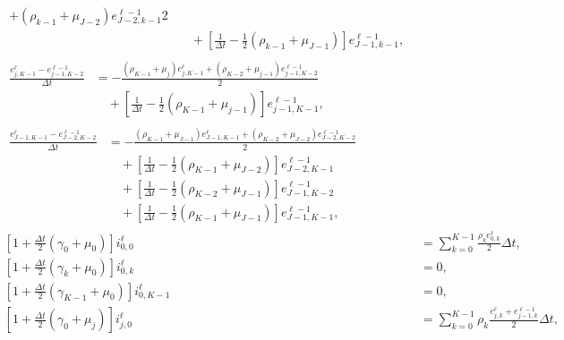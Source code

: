 \documentclass{jpmarticle}
\let\subequationsorig\subequations%
\let\endsubequationsorig\endsubequations%
\renewenvironment{subequations}{
  \subequationsorig
  \renewcommand{\theequation}{\theparentequation.\arabic{equation}}
}{
  \endsubequationsorig
}
\begin{document}
\begin{subequations}
\begin{align}
\begin{split}
{        + (\rho_{k - 1} + \mu_{J - 2}) e_{J - 2, k - 1}^{\ell - 1}}
      {2}
      \\ & \quad {}
      + \left[
        \frac{1}{\Delta t} - \frac{1}{2} (\rho_{k - 1} + \mu_{J - 1})
      \right] e_{J - 1, k - 1}^{\ell - 1},
    \end{split}
    \\
    \begin{split}
      \frac{e_{j, K - 1}^{\ell} - e_{j - 1, K - 2}^{\ell - 1}}{\Delta t}
      &= - \frac{(\rho_{K - 1} + \mu_j) e_{j, K - 1}^{\ell}
        + (\rho_{K - 2} + \mu_{j - 1}) e_{j - 1, K - 2}^{\ell - 1}}
      {2}
      \\ & \quad {}
      + \left[
        \frac{1}{\Delta t} - \frac{1}{2} (\rho_{K - 1} + \mu_{j - 1})
      \right] e_{j - 1, K - 1}^{\ell - 1},
    \end{split}
    \\
    \begin{split}
      \frac{e_{J - 1, K - 1}^{\ell} - e_{J - 2, K - 2}^{\ell - 1}}{\Delta t}
      &= - \frac{(\rho_{K - 1} + \mu_{J - 1}) e_{J - 1, K - 1}^{\ell}
        + (\rho_{K - 2} + \mu_{J - 2}) e_{J - 2, K - 2}^{\ell - 1}}
      {2}
      \\ & \quad {}
      + \left[
        \frac{1}{\Delta t} - \frac{1}{2} (\rho_{K - 1} + \mu_{J - 2})
      \right] e_{J - 2, K - 1}^{\ell - 1}
      \\ & \quad {}
      + \left[
        \frac{1}{\Delta t} - \frac{1}{2} (\rho_{K - 2} + \mu_{J - 1})
      \right] e_{J - 1, K - 2}^{\ell - 1}
      \\ & \quad {}
      + \left[
        \frac{1}{\Delta t} - \frac{1}{2} (\rho_{K - 1} + \mu_{J - 1})
      \right] e_{J - 1, K - 1}^{\ell - 1},
    \end{split}
    \\
    \left[1 + \frac{\Delta t}{2} (\gamma_0 + \mu_0)\right] i_{0, 0}^{\ell}
    &= \sum_{k = 0}^{K - 1} \frac{\rho_k e_{0, k}^{\ell}} {2}
    \Delta t,
    \\
    \left[1 + \frac{\Delta t}{2} (\gamma_k + \mu_0)\right] i_{0, k}^{\ell}
    &= 0,
    \\
    \left[1 + \frac{\Delta t}{2} (\gamma_{K - 1} + \mu_0)\right]
    i_{0, K - 1}^{\ell}
    &= 0,
    \\
    \left[1 + \frac{\Delta t}{2} (\gamma_0 + \mu_j)\right] i_{j, 0}^{\ell}
    &= \sum_{k = 0}^{K - 1} \rho_k
    \frac{e_{j, k}^{\ell} + e_{j - 1, k}^{\ell - 1}} {2}
    \Delta t,
    \\
    \begin{split}

\end{split}
\end{align}
\end{subequations}
\end{document}
